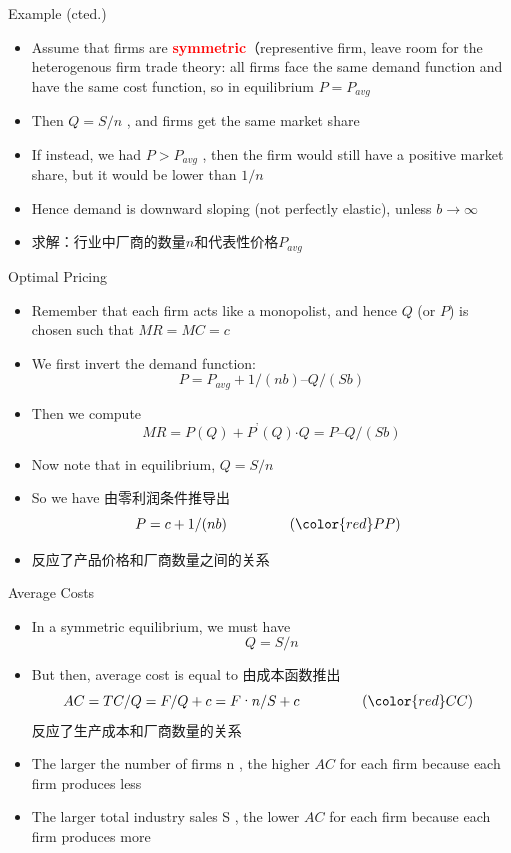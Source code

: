 \documentclass[10pt,hyperref={CJKbookmarks=true},xcolor=dvipsnames,aspectratio=169]{beamer}
\begin{document}
\begin{frame}{Example (cted.)}

\begin{itemize}
\item Assume that firms are \textbf{\textcolor{red}{symmetric}}（representive
firm, leave room for the heterogenous firm trade theory: all firms
face the same demand function and have the same cost function, so
in equilibrium $P=P_{avg}$ 
\item Then $Q=S/n$ , and firms get the same market share 
\item If instead, we had $P>P_{avg}$ , then the firm would still have a
positive market share, but it would be lower than $1/n$ 
\item Hence demand is downward sloping (not perfectly elastic), unless $b\rightarrow\infty$
\item 求解：行业中厂商的数量$n$和代表性价格$P_{avg}$
\end{itemize}
\end{frame}

\begin{frame}{Optimal Pricing }

\begin{itemize}
\item Remember that each firm acts like a monopolist, and hence $Q$ (or
$P$) is chosen such that $MR=MC=c$ 
\item We first invert the demand function: 
\[
P=P_{avg}+1/(nb)\text{–}Q/(Sb)
\]
 
\item Then we compute 
\[
MR=P(Q)+P^{\text{'}}(Q)\text{·}Q=P\text{–}Q/(Sb)
\]

\item Now note that in equilibrium, $Q=S/n$
\item So we have 由零利润条件推导出 
\[
P=c+1/(nb)\begin{array}{ccccc}
 &  &  &  & \left({\color{red}PP}\right)\end{array}
\]

\item 反应了产品价格和厂商数量之间的关系
\end{itemize}
\end{frame}

\begin{frame}{Average Costs }

\begin{itemize}
\item In a symmetric equilibrium, we must have 
\[
Q=S/n
\]
 
\item But then, average cost is equal to 由成本函数推出
\[
AC=TC/Q=F/Q+c=F\text{·}n/S+c\begin{array}{ccccc}
 &  &  &  & \left({\color{red}CC}\right)\end{array}
\]
 反应了生产成本和厂商数量的关系
\item The larger the number of firms n , the higher $AC$ for each firm
because each firm produces less 
\item The larger total industry sales S , the lower $AC$ for each firm
because each firm produces more 
\end{itemize}
\end{frame}
\end{document}
